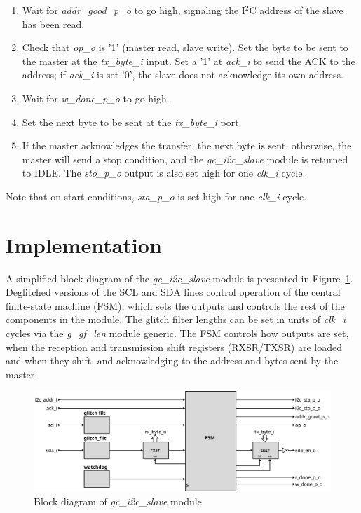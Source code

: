 \documentclass[a4paper,11pt]{article}
\begin{document}
\begin{enumerate}
  \item Wait for \textit{addr\_good\_p\_o} to go high, signaling the I$^2$C address of the slave
    has been read.
  \item Check that \textit{op\_o} is '1' (master read, slave write). Set the byte to be sent
    to the master at the \textit{tx\_byte\_i} input. Set a '1' at \textit{ack\_i} to send the
    ACK to the address; if \textit{ack\_i} is set '0', the slave does not acknowledge its own
    address.
  \item Wait for \textit{w\_done\_p\_o} to go high.
  \item Set the next byte to be sent at the \textit{tx\_byte\_i} port.
  \item If the master acknowledges the transfer, the next byte is sent, otherwise, the master
    will send a stop condition, and the \textit{gc\_i2c\_slave} module is returned to IDLE. The
    \textit{sto\_p\_o} output is also set high for one \textit{clk\_i} cycle.
\end{enumerate}

Note that on start conditions, \textit{sta\_p\_o} is set high for one \textit{clk\_i} cycle.

\section{Implementation}
\label{sec:implem}

A simplified block diagram of the \textit{gc\_i2c\_slave} module is presented in
Figure~\ref{fig:i2c-slave-bd}. Deglitched versions of the SCL and SDA lines control
operation of the central finite-state machine (FSM), which sets the outputs and
controls the rest of the components in the module. The glitch filter lengths can
be set in units of \textit{clk\_i} cycles via the \textit{g\_gf\_len} module generic.
The FSM controls how outputs are set, when the reception and transmission shift registers
(RXSR/TXSR) are loaded and when they shift, and acknowledging to the address and bytes
sent by the master.

\begin{figure}[h]
  \centerline{\includegraphics[width=\textwidth]{fig/i2c-slave-bd}}
  \caption{Block diagram of \textit{gc\_i2c\_slave} module}
  \label{fig:i2c-slave-bd}
\end{figure}
\end{document}

